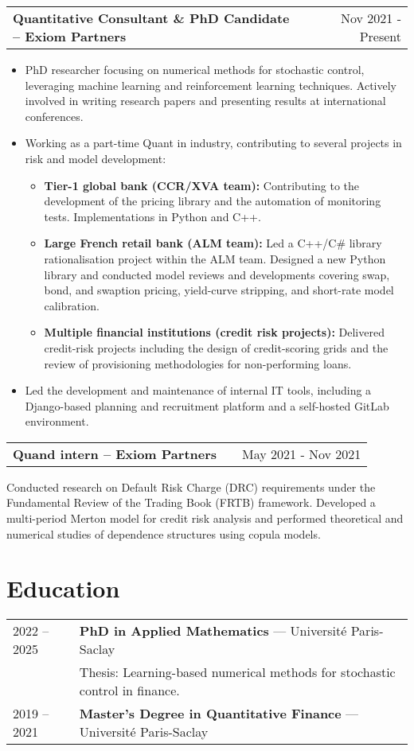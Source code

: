\documentclass[a4paper,11pt]{article}
\makeatletter
\newenvironment{jobshort}[2]
    {
    \begin{tabularx}{\linewidth}{@{}l X r@{}}
    \textbf{#1} & \hfill &  #2 \\[3.75pt]
    \end{tabularx}
    }
    {
    }
\newenvironment{joblong}[2]
    {
    \begin{tabularx}{\linewidth}{@{}l X r@{}}
    \textbf{#1} & \hfill &  #2 \\[3.75pt]
    \end{tabularx}
    \begin{minipage}[t]{\linewidth}
    \begin{itemize}[nosep,after=\strut, leftmargin=1em, itemsep=3pt,label=--]
    }
    {
    \end{itemize}
    \end{minipage}    
    }
\makeatother
\begin{document}
	\begin{joblong}{Quantitative Consultant \& PhD Candidate -- Exiom Partners}{Nov 2021 - Present}
	\item PhD researcher focusing on numerical methods for stochastic control, leveraging machine learning and reinforcement learning techniques. Actively involved in writing research papers and presenting results at international conferences.
	\item Working as a part-time Quant in industry, contributing to several projects in risk and model development:
		\begin{itemize}
			\item \textbf{Tier-1 global bank (CCR/XVA team):} Contributing to the development of the pricing library and the automation of monitoring tests. Implementations in Python and C++.
			\item \textbf{Large French retail bank (ALM team):} Led a C++/C\# library rationalisation project within the ALM team. Designed a new Python library and conducted model reviews and developments covering swap, bond, and swaption pricing, yield-curve stripping, and short-rate model calibration.
			\item \textbf{Multiple financial institutions (credit risk projects):} Delivered credit-risk projects including the design of credit-scoring grids and the review of provisioning methodologies for non-performing loans.
		\end{itemize}
	\item Led the development and maintenance of internal IT tools, including a Django-based planning and recruitment platform and a self-hosted GitLab environment.
	\end{joblong}

	\begin{jobshort}{Quand intern -- Exiom Partners}{May 2021 - Nov 2021}
	Conducted research on Default Risk Charge (DRC) requirements under the Fundamental Review of the Trading Book (FRTB) framework.
	Developed a multi-period Merton model for credit risk analysis and performed theoretical and numerical studies of dependence structures using copula models.
	\end{jobshort}

	\section{Education}
	\begin{tabularx}{\linewidth}{@{}l X@{}}	
		2022 -- 2025 & \textbf{PhD in Applied Mathematics} — Université Paris-Saclay \\
		& Thesis: Learning-based numerical methods for stochastic control in finance. \\
		2019 -- 2021 & \textbf{Master’s Degree in Quantitative Finance} — Université Paris-Saclay
	\end{tabularx}
\end{document}

